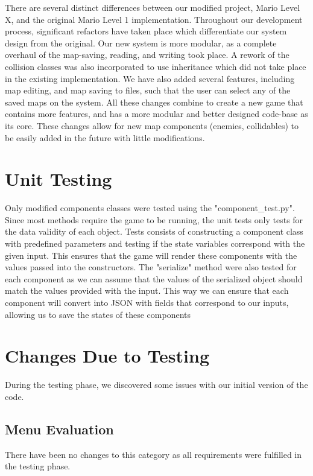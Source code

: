 \documentclass[12pt, titlepage]{article}
\begin{document}
There are several distinct differences between our modified project, Mario Level X, and the original Mario Level 1 implementation. Throughout our development process, significant refactors have taken place which differentiate our system design from the original. Our new system is more modular, as a complete overhaul of the map-saving, reading, and writing took place. A rework of the collision classes was also incorporated to use inheritance which did not take place in the existing implementation. We have also added several features, including map editing, and map saving to files, such that the user can select any of the saved maps on the system. All these changes combine to create a new game that contains more features, and has a more modular and better designed code-base as its core. These changes allow for new map components (enemies, collidables) to be easily added in the future with little modifications.

\section{Unit Testing}

Only modified components classes were tested using the "component\_test.py". Since most methods require the game to be running, the unit tests only tests for the data validity of each object. Tests consists of constructing a component class with predefined parameters and testing if the state variables correspond with the given input. This ensures that the game will render these components with the values passed into the constructors. The "serialize" method were also tested for each component as we can assume that the values of the serialized object should match the values provided with the input. This way we can ensure that each component will convert into JSON with fields that correspond to our inputs, allowing us to save the states of these components

\section{Changes Due to Testing}

During the testing phase, we discovered some issues with our initial version of the code.

\subsection{Menu Evaluation}

There have been no changes to this category as all requirements were fulfilled in the testing phase.
\end{document}
